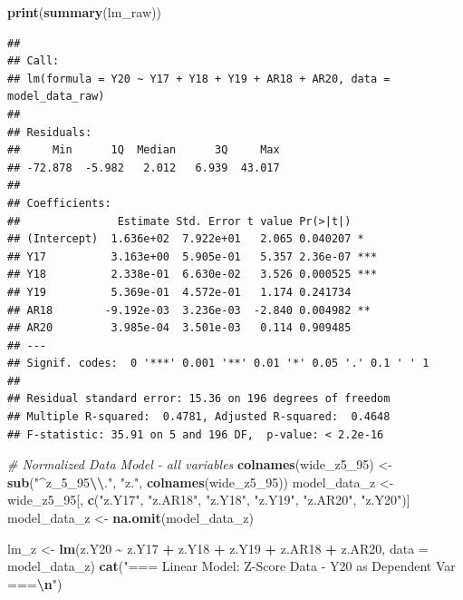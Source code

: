 \documentclass[
]{article}
\newenvironment{Shaded}{\begin{snugshade}}{\end{snugshade}}
\newcommand{\AttributeTok}[1]{\textcolor[rgb]{0.13,0.29,0.53}{#1}}
\newcommand{\CommentTok}[1]{\textcolor[rgb]{0.56,0.35,0.01}{\textit{#1}}}
\newcommand{\FunctionTok}[1]{\textcolor[rgb]{0.13,0.29,0.53}{\textbf{#1}}}
\newcommand{\NormalTok}[1]{#1}
\newcommand{\OtherTok}[1]{\textcolor[rgb]{0.56,0.35,0.01}{#1}}
\newcommand{\SpecialCharTok}[1]{\textcolor[rgb]{0.81,0.36,0.00}{\textbf{#1}}}
\newcommand{\StringTok}[1]{\textcolor[rgb]{0.31,0.60,0.02}{#1}}
\begin{document}
\begin{Shaded}
\begin{Highlighting}[]
\FunctionTok{print}\NormalTok{(}\FunctionTok{summary}\NormalTok{(lm\_raw))}
\end{Highlighting}
\end{Shaded}

\begin{verbatim}
## 
## Call:
## lm(formula = Y20 ~ Y17 + Y18 + Y19 + AR18 + AR20, data = model_data_raw)
## 
## Residuals:
##     Min      1Q  Median      3Q     Max 
## -72.878  -5.982   2.012   6.939  43.017 
## 
## Coefficients:
##               Estimate Std. Error t value Pr(>|t|)    
## (Intercept)  1.636e+02  7.922e+01   2.065 0.040207 *  
## Y17          3.163e+00  5.905e-01   5.357 2.36e-07 ***
## Y18          2.338e-01  6.630e-02   3.526 0.000525 ***
## Y19          5.369e-01  4.572e-01   1.174 0.241734    
## AR18        -9.192e-03  3.236e-03  -2.840 0.004982 ** 
## AR20         3.985e-04  3.501e-03   0.114 0.909485    
## ---
## Signif. codes:  0 '***' 0.001 '**' 0.01 '*' 0.05 '.' 0.1 ' ' 1
## 
## Residual standard error: 15.36 on 196 degrees of freedom
## Multiple R-squared:  0.4781, Adjusted R-squared:  0.4648 
## F-statistic: 35.91 on 5 and 196 DF,  p-value: < 2.2e-16
\end{verbatim}

\begin{Shaded}
\begin{Highlighting}[]
\CommentTok{\# Normalized Data Model {-} all variables}
\FunctionTok{colnames}\NormalTok{(wide\_z5\_95) }\OtherTok{\textless{}{-}} \FunctionTok{sub}\NormalTok{(}\StringTok{"\^{}z\_5\_95}\SpecialCharTok{\textbackslash{}\textbackslash{}}\StringTok{."}\NormalTok{, }\StringTok{"z."}\NormalTok{, }\FunctionTok{colnames}\NormalTok{(wide\_z5\_95))}
\NormalTok{model\_data\_z }\OtherTok{\textless{}{-}}\NormalTok{ wide\_z5\_95[, }\FunctionTok{c}\NormalTok{(}\StringTok{"z.Y17"}\NormalTok{, }\StringTok{"z.AR18"}\NormalTok{, }\StringTok{"z.Y18"}\NormalTok{, }\StringTok{"z.Y19"}\NormalTok{, }\StringTok{"z.AR20"}\NormalTok{, }\StringTok{"z.Y20"}\NormalTok{)]}
\NormalTok{model\_data\_z }\OtherTok{\textless{}{-}} \FunctionTok{na.omit}\NormalTok{(model\_data\_z)}

\NormalTok{lm\_z }\OtherTok{\textless{}{-}} \FunctionTok{lm}\NormalTok{(z.Y20 }\SpecialCharTok{\textasciitilde{}}\NormalTok{ z.Y17 }\SpecialCharTok{+}\NormalTok{ z.Y18 }\SpecialCharTok{+}\NormalTok{ z.Y19 }\SpecialCharTok{+}\NormalTok{ z.AR18 }\SpecialCharTok{+}\NormalTok{ z.AR20, }\AttributeTok{data =}\NormalTok{ model\_data\_z)}
\FunctionTok{cat}\NormalTok{(}\StringTok{"=== Linear Model: Z{-}Score Data {-} Y20 as Dependent Var ===}\SpecialCharTok{\textbackslash{}n}\StringTok{"}\NormalTok{)}
\end{Highlighting}
\end{Shaded}
\end{document}
